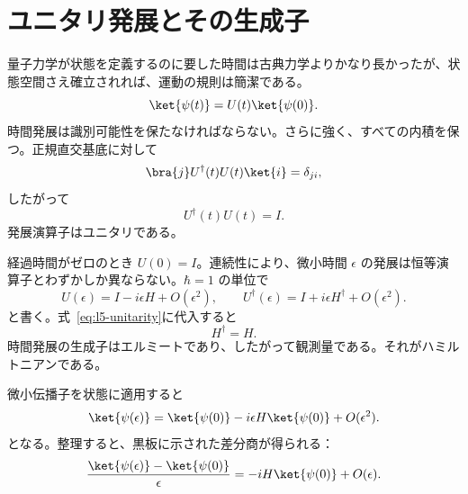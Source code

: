 \begin{classroomqa}
\end{classroomqa}

\section{ユニタリ発展とその生成子}

量子力学が状態を定義するのに要した時間は古典力学よりかなり長かったが、状態空間さえ確立されれば、運動の規則は簡潔である。
\begin{equation}
\ket{\psi(t)}=U(t)\ket{\psi(0)}.
\label{eq:l5-propagator}
\end{equation}
時間発展は識別可能性を保たなければならない。さらに強く、すべての内積を保つ。正規直交基底に対して
\begin{equation}
\bra{j}U^\dagger(t)U(t)\ket{i}=\delta_{ji},
\end{equation}
したがって
\begin{equation}
U^\dagger(t)U(t)=I.
\label{eq:l5-unitarity}
\end{equation}
発展演算子はユニタリである。

経過時間がゼロのとき \(U(0)=I\)。連続性により、微小時間 \(\epsilon\) の発展は恒等演算子とわずかしか異ならない。\(\hbar=1\) の単位で
\begin{equation}
U(\epsilon)=I-i\epsilon H+O(\epsilon^2),
\qquad
U^\dagger(\epsilon)=I+i\epsilon H^\dagger+O(\epsilon^2).
\end{equation}
と書く。式~\eqref{eq:l5-unitarity}に代入すると
\begin{equation}
H^\dagger=H.
\end{equation}
時間発展の生成子はエルミートであり、したがって観測量である。それがハミルトニアンである。

微小伝播子を状態に適用すると
\begin{equation}
\ket{\psi(\epsilon)}
=\ket{\psi(0)}-i\epsilon H\ket{\psi(0)}+O(\epsilon^2).
\end{equation}
となる。整理すると、黒板に示された差分商が得られる：
\begin{equation}
\frac{\ket{\psi(\epsilon)}-\ket{\psi(0)}}{\epsilon}
=-iH\ket{\psi(0)}+O(\epsilon).
\end{equation}

